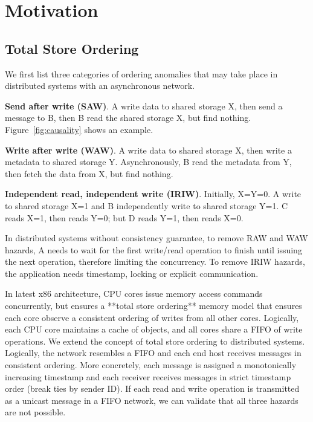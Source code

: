 \section{Motivation}
\label{sec:motivation}


\subsection{Total Store Ordering}
\label{subsec:tso}


We first list three categories of ordering anomalies that may take place in distributed systems with an asynchronous network.

\textbf{Send after write (SAW)}. A write data to shared storage X, then send a message to B, then B read the shared storage X, but find nothing. Figure~\ref{fig:causality} shows an example.

\textbf{Write after write (WAW)}. A write data to shared storage X, then write a metadata to shared storage Y. Asynchronously, B read the metadata from Y, then fetch the data from X, but find nothing.

\textbf{Independent read, independent write (IRIW)}. Initially, X=Y=0. A write to shared storage X=1 and B independently write to shared storage Y=1. C reads X=1, then reads Y=0; but D reads Y=1, then reads X=0.

In distributed systems without consistency guarantee, to remove RAW and WAW hazards, A needs to wait for the first write/read operation to finish until issuing the next operation, therefore limiting the concurrency. To remove IRIW hazards, the application needs timestamp, locking or explicit communication.

In latest x86 architecture, CPU cores issue memory access commands concurrently, but ensures a **total store ordering** memory model that ensures each core observe a consistent ordering of writes from all other cores. Logically, each CPU core maintains a cache of objects, and all cores share a FIFO of write operations. We extend the concept of total store ordering to distributed systems. Logically, the network resembles a FIFO and each end host receives messages in consistent ordering. More concretely, each message is assigned a monotonically increasing timestamp and each receiver receives messages in strict timestamp order (break ties by sender ID). If each read and write operation is transmitted as a unicast message in a FIFO network, we can validate that all three hazards are not possible.

